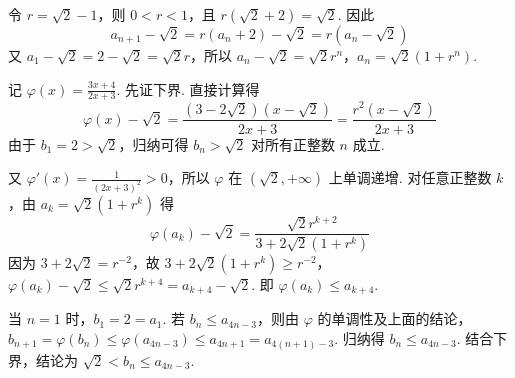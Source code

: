 \begin{solution}
令 \(r=\sqrt2-1\)，则 \(0<r<1\)，且 \(r(\sqrt2+2)=\sqrt2\). 因此
\[
a_{n+1}-\sqrt2=r(a_n+2)-\sqrt2=r(a_n-\sqrt2)
\]
又 \(a_1-\sqrt2=2-\sqrt2=\sqrt2r\)，所以
\(a_n-\sqrt2=\sqrt2r^n\)，\(a_n=\sqrt2(1+r^n)\).

记 \(\varphi(x)=\frac{3x+4}{2x+3}\). 先证下界. 直接计算得
\[
\varphi(x)-\sqrt2=\frac{(3-2\sqrt2)(x-\sqrt2)}{2x+3}=\frac{r^2(x-\sqrt2)}{2x+3}
\]
由于 \(b_1=2>\sqrt2\)，归纳可得 \(b_n>\sqrt2\) 对所有正整数 \(n\) 成立.

又 \(\varphi'(x)=\frac{1}{(2x+3)^2}>0\)，所以 \(\varphi\) 在 \((\sqrt2,+\infty)\) 上单调递增. 对任意正整数 \(k\)，由 \(a_k=\sqrt2(1+r^k)\) 得
\[
\varphi(a_k)-\sqrt2=\frac{\sqrt2r^{k+2}}{3+2\sqrt2(1+r^k)}
\]
因为 \(3+2\sqrt2=r^{-2}\)，故
\(3+2\sqrt2(1+r^k)\geqslant r^{-2}\)，\(\varphi(a_k)-\sqrt2\leqslant\sqrt2r^{k+4}=a_{k+4}-\sqrt2\).
即 \(\varphi(a_k)\leqslant a_{k+4}\).

当 \(n=1\) 时，\(b_1=2=a_1\). 若 \(b_n\leqslant a_{4n-3}\)，则由 \(\varphi\) 的单调性及上面的结论，\(b_{n+1}=\varphi(b_n)\leqslant\varphi(a_{4n-3})\leqslant a_{4n+1}=a_{4(n+1)-3}\). 归纳得 \(b_n\leqslant a_{4n-3}\). 结合下界，结论为 \(\sqrt2<b_n\leqslant a_{4n-3}\).
\end{solution}
